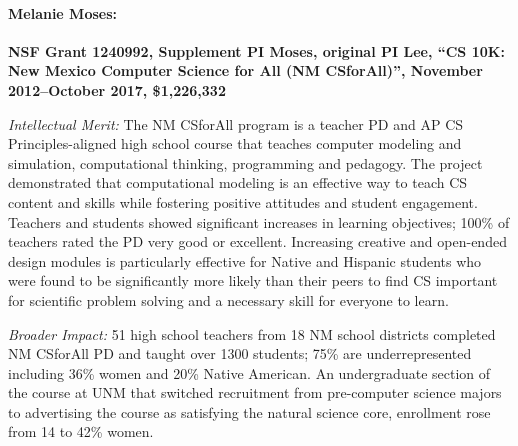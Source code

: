 \paragraph{Melanie Moses:}
\textbf{NSF Grant 1240992, Supplement PI Moses, original PI Lee, ``CS 10K: New Mexico Computer Science for All (NM CSforAll)'', November 2012--October 2017, \$1,226,332} 

\noindent \textit{Intellectual Merit:} The NM CSforAll program is a teacher PD and AP CS Principles-aligned high school course that teaches computer modeling and simulation, computational thinking, programming and pedagogy. %
The project demonstrated that computational modeling is an effective way to teach CS content and skills while fostering positive attitudes and student engagement.
Teachers and students showed significant increases in learning objectives; 100\% of teachers rated the PD very good or excellent. Increasing creative and open-ended design modules is particularly effective for Native and Hispanic students who were found to be significantly more likely than their peers to find CS important for scientific problem solving and a necessary skill for everyone to learn.

\noindent \textit{Broader Impact:}
51 high school teachers from 18 NM school districts completed NM CSforAll PD and taught over 1300 students; 75\% are underrepresented including 36\% women and 20\% Native American. An undergraduate section of the course at UNM that switched recruitment from pre-computer science majors to advertising the course as satisfying the natural science core, enrollment rose from 14 to 42\% women. 

